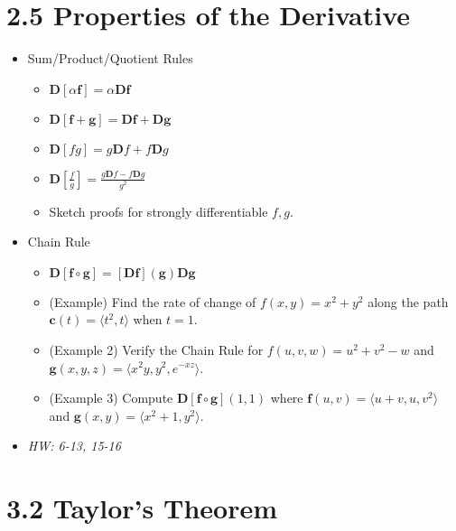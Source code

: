 \documentclass[11pt]{article}
\theoremstyle{plain}
\theoremstyle{definition}
\theoremstyle{remark}
\newcommand{\vect}[1]{\mathbf{#1}}
\newcommand{\<}{\langle}
\renewcommand{\>}{\rangle}
\begin{document}

\section*{2.5 Properties of the Derivative}

\begin{itemize}
  \item Sum/Product/Quotient Rules
    \begin{itemize}
      \item \(\vect D[\alpha \vect f]=\alpha\vect D\vect f\)
      \item \(\vect D[\vect f+\vect g]=\vect D\vect f+\vect D\vect g\)
      \item
        \(
          \vect D[fg]=g\vect Df + f\vect Dg
        \)
      \item
        \(
          \vect D[\frac{f}{g}]
            =
          \frac{
            g\vect Df - f\vect Dg
          }{
            g^2
          }
        \)
      \item Sketch proofs for strongly differentiable \(f,g\).
    \end{itemize}
  \item Chain Rule
    \begin{itemize}
      \item
        \(
          \vect D [\vect f\circ \vect g]
            =
          [\vect D\vect f](\vect g)\vect D\vect g
        \)
      \item
        (Example) Find the rate of change of \(f(x,y)=x^2+y^2\) along
        the path \(\vect c(t)=\<t^2,t\>\) when \(t=1\).
      \item
        (Example 2) Verify the Chain Rule for \(f(u,v,w)=u^2+v^2-w\)
        and \(\vect g(x,y,z)=\<x^2y,y^2,e^{-xz}\>\).
      \item
        (Example 3) Compute \(\vect D[\vect f\circ\vect g](1,1)\) where
        \(\vect f(u,v)=\<u+v,u,v^2\>\) and \(\vect g(x,y)=\<x^2+1,y^2\>\).
    \end{itemize}
  \item\textit{
    HW: 6-13, 15-16
  }
\end{itemize}


\section*{3.2 Taylor's Theorem}
\end{document}
